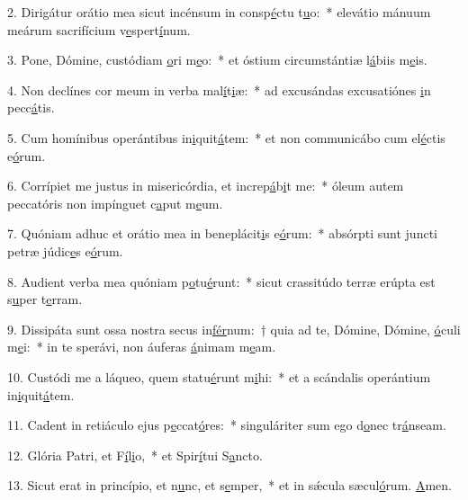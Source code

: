 2. Dirigátur orátio mea sicut incénsum in consp\uline{é}ctu t\uline{u}o:~* elevátio mánuum meárum sacrifícium v\uline{e}spert\uline{í}num.\par 
3. Pone, Dómine, custódiam \uline{o}ri m\uline{e}o:~* et óstium circumstántiæ l\uline{á}biis m\uline{e}is.\par 
4. Non declínes cor meum in verba mal\uline{í}t\uline{i}æ:~* ad excusándas excusatiónes \uline{i}n pecc\uline{á}tis.\par 
5. Cum homínibus operántibus in\uline{i}quit\uline{á}tem:~* et non communicábo cum el\uline{é}ctis e\uline{ó}rum.\par 
6. Corrípiet me justus in misericórdia, et increp\uline{á}b\uline{i}t me:~* óleum autem peccatóris non impínguet c\uline{a}put m\uline{e}um.\par 
7. Quóniam adhuc et orátio mea in beneplácit\uline{i}s e\uline{ó}rum:~* absórpti sunt juncti petræ júdic\uline{e}s e\uline{ó}rum.\par 
8. Audient verba mea quóniam p\uline{o}tu\uline{é}runt:~* sicut crassitúdo terræ erúpta est s\uline{u}per t\uline{e}rram.\par 
9. Dissipáta sunt ossa nostra secus in\uline{fér}num:~† quia ad te, Dómine, Dómine, \uline{ó}culi m\uline{e}i:~* in te sperávi, non áuferas \uline{á}nimam m\uline{e}am.\par 
10. Custódi me a láqueo, quem statu\uline{é}runt m\uline{i}hi:~* et a scándalis operántium in\uline{i}quit\uline{á}tem.\par 
11. Cadent in retiáculo ejus p\uline{e}ccat\uline{ó}res:~* singuláriter sum ego d\uline{o}nec tr\uline{á}nseam.\par 
12. Glória Patri, et F\uline{í}l\uline{i}o,~* et Spir\uline{í}tui S\uline{a}ncto.\par 
13. Sicut erat in princípio, et n\uline{u}nc, et s\uline{e}mper,~* et in sǽcula sæcul\uline{ó}rum. \uline{A}men.\par 
